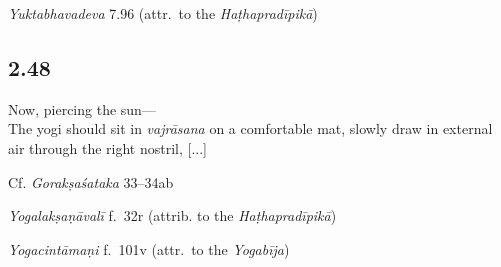 \begin{ekdosis}
\begin{testimonia}[hp02_047]
\emph{Yuktabhavadeva} 7.96 (attr.~to the \emph{Haṭhapradīpikā})

\begin{versinnote}
\end{versinnote}
\end{testimonia}


\subsection*{2.48}
\begin{translation}[hp02_048]
Now, piercing the sun---\\
The yogi should sit in \emph{vajrāsana} on a comfortable mat, slowly draw in external air through the right nostril, [...]
\end{translation}

\begin{sources}[hp02_048]
Cf. \emph{Gorakṣaśataka} 33–34ab
\begin{versinnote}
\end{versinnote} 
\end{sources}

\begin{testimonia}[hp02_048]
\emph{Yogalakṣaṇāvalī} f.~32r (attrib. to the \emph{Haṭhapradīpikā})
\begin{versinnote}
\end{versinnote}

\emph{Yogacintāmaṇi} f.~101v (attr.~to the \emph{Yogabīja})

\begin{versinnote}
\end{versinnote} 


\end{testimonia}
\end{ekdosis}
